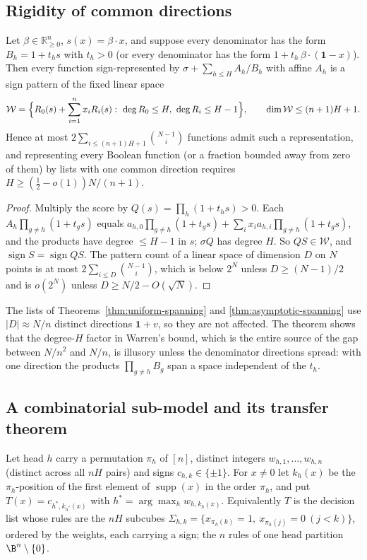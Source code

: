 \subsection{Rigidity of common directions}
\begin{theorem}
\label{thm:wn-common-direction}
Let $\beta\in\mathbb R^n_{\ge0}$, $s(x)=\beta\cdot x$, and suppose every
denominator has the form $B_h=1+t_h s$ with $t_h>0$ (or every denominator
has the form $1+t_h\,\beta\cdot(\mathbf1-x)$). Then every function
sign-represented by $\sigma+\sum_{h\le H}A_h/B_h$ with affine $A_h$ is a
sign pattern of the fixed linear space
\[
 \mathcal W=\Bigl\{R_0(s)+\sum_{i=1}^nx_iR_i(s):\ \deg R_0\le H,\ \deg R_i\le H-1\Bigr\},
 \qquad \dim\mathcal W\le(n+1)H+1 .
\]
Hence at most $2\sum_{i\le(n+1)H+1}\binom{N-1}i$ functions admit such a
representation, and representing every Boolean function (or a fraction
bounded away from zero of them) by lists with one common direction
requires $H\ge(\tfrac12-o(1))N/(n+1)$.
\end{theorem}
\begin{proof}
Multiply the score by $Q(s)=\prod_h(1+t_hs)>0$. Each
$A_h\prod_{g\ne h}(1+t_gs)$ equals $a_{h,0}\prod_{g\ne h}(1+t_gs)+\sum_ix_ia_{h,i}\prod_{g\ne h}(1+t_gs)$,
and the products have degree $\le H-1$ in $s$; $\sigma Q$ has degree
$H$. So $QS\in\mathcal W$, and $\operatorname{sign}S=\operatorname{sign}QS$.
The pattern count of a linear space of dimension $D$ on $N$ points is at
most $2\sum_{i\le D}\binom{N-1}i$, which is below $2^N$ unless
$D\ge(N-1)/2$ and is $o(2^N)$ unless $D\ge N/2-O(\sqrt N)$.
\end{proof}

The lists of Theorems~\ref{thm:uniform-spanning} and
\ref{thm:asymptotic-spanning} use $|D|\approx N/n$ distinct directions
$\mathbf1+v$, so they are not affected. The theorem shows that the
degree-$H$ factor in Warren's bound, which is the entire source of the
gap between $N/n^2$ and $N/n$, is illusory unless the denominator
directions spread: with one direction the products
$\prod_{g\ne h}B_g$ span a space independent of the $t_h$.

\subsection{A combinatorial sub-model and its transfer theorem}
\label{sec:wn-tropical}
Let head $h$ carry a permutation $\pi_h$ of $[n]$, distinct integers
$w_{h,1},\dots,w_{h,n}$ (distinct across all $nH$ pairs) and signs
$c_{h,k}\in\{\pm1\}$. For $x\ne0$ let $k_h(x)$ be the $\pi_h$-position of
the first element of $\operatorname{supp}(x)$ in the order $\pi_h$, and
put $T(x)=c_{h^\ast,k_{h^\ast}(x)}$ with
$h^\ast=\arg\max_hw_{h,k_h(x)}$. Equivalently $T$ is the decision list
whose rules are the $nH$ subcubes
$\Sigma_{h,k}=\{x_{\pi_h(k)}=1,\ x_{\pi_h(j)}=0\ (j<k)\}$, ordered by the
weights, each carrying a sign; the $n$ rules of one head partition
$\B^n\setminus\{0\}$.

